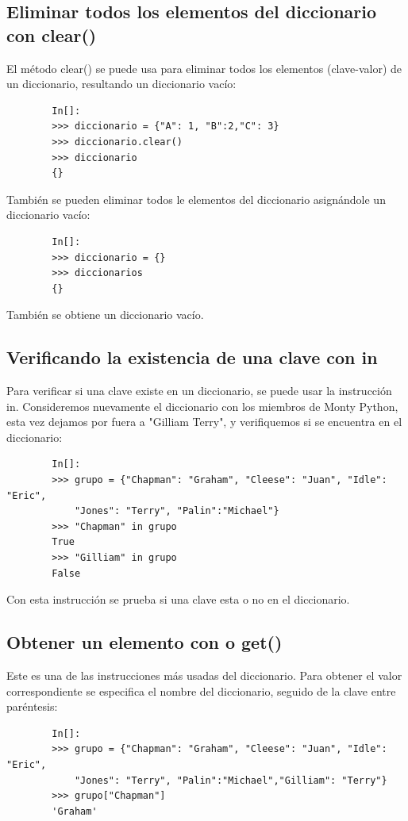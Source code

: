 	
	\subsection{Eliminar todos los elementos del diccionario con {\ttfamily clear()}}
	
	El método {\ttfamily clear()} se puede usa para eliminar todos los elementos (clave-valor) de un diccionario, resultando un diccionario vacío: 
	
	\begin{lstlisting}
		In[]:	
		>>> diccionario = {"A": 1, "B":2,"C": 3} 
		>>> diccionario.clear()
		>>> diccionario
		{}
	\end{lstlisting}
	
	\noindent También se pueden eliminar todos le elementos del diccionario  asignándole  un diccionario vacío:
	\begin{lstlisting}
		In[]:	
		>>> diccionario = {}
		>>> diccionarios 
		{}
	\end{lstlisting}
	
	\noindent También se obtiene un diccionario vacío. 
	
	
	\subsection{Verificando la existencia de una clave con {\ttfamily in}}
	
	Para verificar si una clave existe en un diccionario, se puede usar la instrucción  {\ttfamily in}. Consideremos  nuevamente el diccionario con los miembros de Monty Python, esta vez dejamos por fuera a  "Gilliam Terry", y verifiquemos si se encuentra en el diccionario:
	
	\begin{lstlisting}
		In[]:	
		>>> grupo = {"Chapman": "Graham", "Cleese": "Juan", "Idle": "Eric", 
			"Jones": "Terry", "Palin":"Michael"}
		>>> "Chapman" in grupo
		True
		>>> "Gilliam" in grupo
		False
	\end{lstlisting}
	Con esta instrucción se prueba si una clave esta o no en el diccionario.  
	
	\subsection{Obtener un elemento con  {\ttfamily []} o  {\ttfamily get()}}
	
	Este es una de las instrucciones más usadas del diccionario. Para obtener el valor correspondiente se especifica el nombre del diccionario, seguido de la clave entre paréntesis:
	\begin{lstlisting}
		In[]:	
		>>> grupo = {"Chapman": "Graham", "Cleese": "Juan", "Idle": "Eric", 
			"Jones": "Terry", "Palin":"Michael","Gilliam": "Terry"}
		>>> grupo["Chapman"]
		'Graham'
	\end{lstlisting}
	
